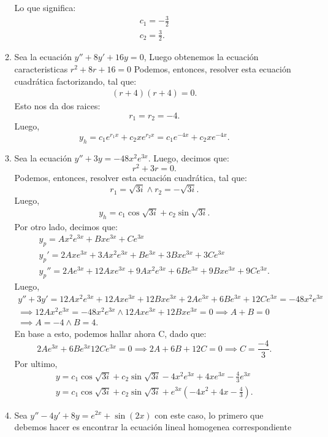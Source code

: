 \begin{enumerate}
\begin{enumerate}
	    Lo que significa:
	    \begin{align*}
	      c_1 = -\frac{3}{2}\\
	      c_2 = \frac{3}{2}
	    .\end{align*}
	  \item Sea la ecuación $y''+8y'+16y=0$, Luego obtenemos la ecuación caracteristicas  $r^2+8r+16=0$
	    Podemos, entonces, resolver esta ecuación cuadrática factorizando, tal que:
	    \begin{align*}
	      \left( r+4 \right) \left( r+4 \right) = 0
	    .\end{align*} Esto nos da dos raices: \[
	    r_1=r_2=-4
	    .\] Luego, \[
	    y_h = c_1e^{r_1x}+c_2xe^{r_2x}=c_1e^{-4x}+c_2xe^{-4x}
	    .\] 
	  \item Sea la ecuación $y''+3y=-48x^2e^{3x}$. Luego, decimos que: \[
	  r^2+3r=0
	  .\] Podemos, entonces, resolver esta ecuación cuadrática, tal que: \[
	  r_1 = \sqrt{3i} \land r_2=-\sqrt{3i} 
	  .\] Luego,
	  \begin{align*}
	    y_h = c_1\cos\sqrt{3i} + c_2\sin\sqrt{3i} 
	  .\end{align*}
	  Por otro lado, decimos que:
	  \begin{align*}
	    y_p = Ax^2e^{3x}+Bxe^{3x}+Ce^{3x}\\
	    y_p' = 2Axe^{3x}+3Ax^2e^{3x}+Be^{3x}+3Bxe^{3x}+3Ce^{3x}\\
	    y_p'' = 2Ae^{3x}+12Axe^{3x}+9Ax^2e^{3x}+6Be^{3x}+9Bxe^{3x}+9Ce^{3x}
	  .\end{align*}
	  Luego,
	  \begin{align*}
	    y''+3y'=12Ax^2e^{3x}+12Axe^{3x}+12Bxe^{3x}+2Ae^{3x}+6Be^{3x}+12Ce^{3x}=-48x^2e^{3x}\\
	    \implies 12Ax^2e^{3x}=-48x^2e^{3x}\land 12Axe^{3x}+12Bxe^{3x}=0\implies A+B=0 \\
	    \implies A = -4 \land B = 4
	  .\end{align*}
	  En base a esto, podemos hallar ahora C, dado que: \[
	  2Ae^{3x}+6Be^{3x}12Ce^{3x}=0 \implies 2A + 6B + 12C = 0 \implies C = \frac{-4}{3}
	  .\] Por ultimo,
	  \begin{align*}
	    y = c_1\cos\sqrt{3i} + c_2\sin\sqrt{3i} - 4x^2e^{3x} + 4xe^{3x}-\frac{4}{3}e^{3x}\\
	    y = c_1\cos\sqrt{3i} + c_2\sin\sqrt{3i} + e^{3x}\left( -4x^2+4x - \frac{4}{3} \right) 
	  .\end{align*}
	  \item Sea $y''-4y'+8y=e^{2x}+\sin\left( 2x \right) $ con este caso, lo primero que debemos hacer es encontrar la ecuación lineal homogenea correspondiente

\end{enumerate}
\end{enumerate}
